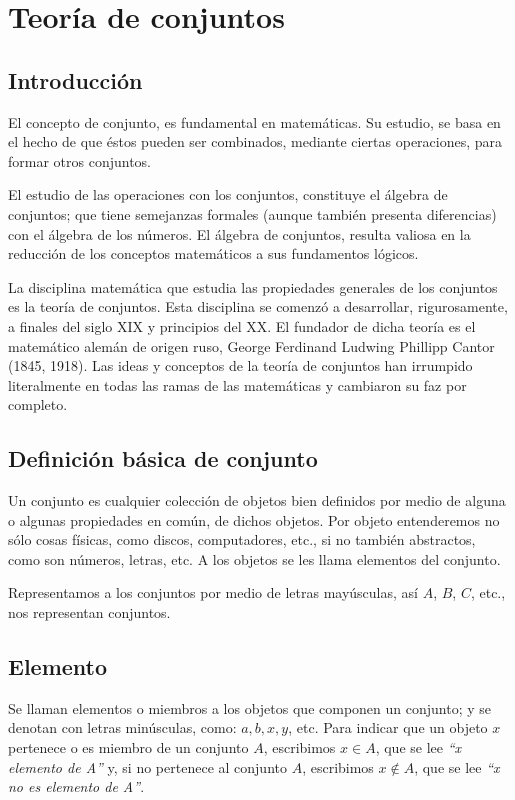 \section{Teoría de conjuntos}
\subsection{Introducción}

El concepto de conjunto, es fundamental en matemáticas. Su estudio, se basa en
el hecho de que éstos pueden ser combinados, mediante ciertas operaciones, para
formar otros conjuntos. 

El estudio de las operaciones con los conjuntos, constituye el álgebra de
conjuntos; que tiene semejanzas formales (aunque también presenta diferencias)
con el álgebra de los números. El álgebra de conjuntos, resulta valiosa en la
reducción de los conceptos matemáticos a sus fundamentos lógicos. 

La disciplina matemática que estudia las propiedades generales de los conjuntos
es la teoría de conjuntos. Esta disciplina se comenzó a desarrollar,
rigurosamente, a finales del siglo XIX y principios del XX. El fundador de dicha
teoría es el matemático alemán de origen ruso, George Ferdinand Ludwing
Phillipp Cantor (1845, 1918). Las ideas y conceptos de la teoría de conjuntos
han irrumpido literalmente en todas las ramas de las matemáticas y cambiaron su
faz por completo.

\subsection{Definición básica de conjunto}

Un conjunto es cualquier colección de objetos bien definidos por medio de alguna
o algunas propiedades en común, de dichos objetos. Por objeto entenderemos no
sólo cosas físicas, como discos, computadores, etc., si no también abstractos,
como son números, letras, etc. A los objetos se les llama elementos del
conjunto.

Representamos a los conjuntos por medio de letras mayúsculas, así $A$, $B$, $C$,
etc., nos representan conjuntos.

\subsection{Elemento}

Se llaman elementos o miembros a los objetos que componen un conjunto; y se
denotan con letras minúsculas, como: $a, b, x, y$, etc. Para indicar que un
objeto $x$ pertenece o es miembro de un conjunto $A$, escribimos $x \in A$, que
se lee \textit{“x elemento de A”} y, si no pertenece al conjunto $A$, escribimos
$x \notin A$, que se lee \textit{“x no es elemento de A”}.

